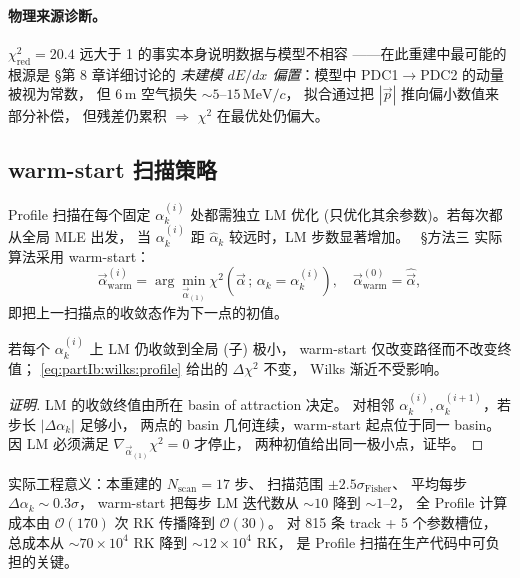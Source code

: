 \paragraph{物理来源诊断。}
$\chi^2_{\mathrm{red}}=20.4$ 远大于 1 的事实本身说明数据与模型不相容
——在此重建中最可能的根源是 §第 8 章详细讨论的
\emph{未建模 $dE/dx$ 偏置}：模型中 PDC1$\to$PDC2 的动量被视为常数，
但 6\,m 空气损失 $\sim 5$–$15\,\mathrm{MeV}/c$，
拟合通过把 $|\vec p|$ 推向偏小数值来部分补偿，
但残差仍累积 $\Rightarrow$ $\chi^2$ 在最优处仍偏大。

\subsection{warm-start 扫描策略}
\label{sec:partIb:wilks:warmstart}

Profile 扫描在每个固定 $\alpha_k^{(i)}$ 处都需独立 LM 优化
(只优化其余参数)。若每次都从全局 MLE 出发，
当 $\alpha_k^{(i)}$ 距 $\hat\alpha_k$ 较远时，LM 步数显著增加。
\StatusReport\ §方法三 实际算法采用 warm-start：
\begin{equation}
  \vec\alpha_{\mathrm{warm}}^{(i)} = \arg\min_{\vec\alpha_{(1)}}
     \chi^2(\vec\alpha\,;\,\alpha_k=\alpha_k^{(i)}),
  \quad
  \vec\alpha_{\mathrm{warm}}^{(0)} = \hat{\vec\alpha},
  \label{eq:partIb:wilks:warm}
\end{equation}
即把上一扫描点的收敛态作为下一点的初值。

\begin{proposition}
\label{prop:partIb:warmstart}
若每个 $\alpha_k^{(i)}$ 上 LM 仍收敛到全局 (子) 极小，
warm-start 仅改变路径而不改变终值；
\eqref{eq:partIb:wilks:profile} 给出的 $\Delta\chi^2$ 不变，
Wilks 渐近不受影响。
\end{proposition}

\begin{proof}[证明]
LM 的收敛终值由所在 basin of attraction 决定。
对相邻 $\alpha_k^{(i)},\alpha_k^{(i+1)}$，若步长 $|\Delta\alpha_k|$ 足够小，
两点的 basin 几何连续，warm-start 起点位于同一 basin。
因 LM 必须满足 $\nabla_{\vec\alpha_{(1)}}\chi^2 = 0$ 才停止，
两种初值给出同一极小点，证毕。\qedhere
\end{proof}

实际工程意义：本重建的 $N_{\mathrm{scan}}=17$ 步、
扫描范围 $\pm 2.5\sigma_{\mathrm{Fisher}}$、
平均每步 $\Delta\alpha_k \sim 0.3\sigma$，
warm-start 把每步 LM 迭代数从 $\sim 10$ 降到 $\sim 1$–$2$，
全 Profile 计算成本由 $\mathcal O(170)$ 次 RK 传播降到 $\mathcal O(30)$。
对 815 条 track + 5 个参数槽位，
总成本从 $\sim 70\times 10^4$ RK 降到 $\sim 12\times 10^4$ RK，
是 Profile 扫描在生产代码中可负担的关键。

